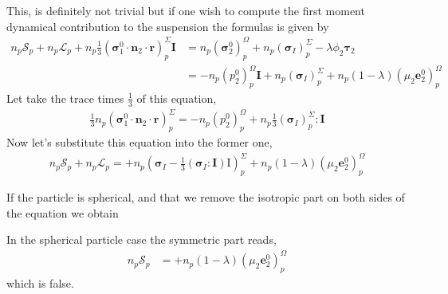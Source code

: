 This, is definitely not trivial but if one wish to compute the first moment dynamical contribution to the suspension the formulas is given by 
\begin{align*}
    n_p \mathscr{S}_p
+ n_p \mathscr{L}_p
+ n_p\frac{1}{3}(\bm{\sigma}_1^0 \cdot \textbf{n}_2 \cdot \textbf{r})_p^\Sigma \textbf{I}
    &= 
    n_p \left(
        \bm{\sigma}_2^0
    \right)_p^\Omega
    +n_p (\bm{\sigma}_I)^\Sigma_p
    - \lambda \phi_2 \bm{\tau}_2\\
    &= 
    - n_p \left(
        p_2^0
    \right)_p^\Omega \textbf{I}
    +n_p (\bm{\sigma}_I)^\Sigma_p
    + n_p (1 - \lambda)\left(
        \mu_2 \textbf{e}_2^0
    \right)_p^\Omega 
\end{align*}
Let take the trace times $\frac{1}{3}$ of this equation, 
\begin{align*}
    \frac{1}{3} n_p(\bm{\sigma}_1^0 \cdot \textbf{n}_2 \cdot \textbf{r})_p^\Sigma 
    = 
    - n_p \left(
        p_2^0
    \right)_p^\Omega 
    +n_p \frac{1}{3}(\bm{\sigma}_I)^\Sigma_p : \textbf{I}
\end{align*}
Now let's substitute this equation into the former one, 
\begin{align*}
    n_p \mathscr{S}_p
+ n_p \mathscr{L}_p
=
    +n_p (\bm{\sigma}_I - \frac{1}{3}(\bm{\sigma}_I : \textbf{I})\text{I})^\Sigma_p
    + n_p (1 - \lambda)\left(
        \mu_2 \textbf{e}_2^0
    \right)_p^\Omega 
\end{align*}

If the particle is spherical, and that we remove the isotropic part on both sides of the equation we obtain 

In the spherical particle case the symmetric part reads, 
\begin{align*}
    n_p \mathscr{S}_p
    &= 
    + n_p (1 - \lambda)\left(
        \mu_2 \textbf{e}_2^0
    \right)_p^\Omega 
\end{align*}
which is false. 


